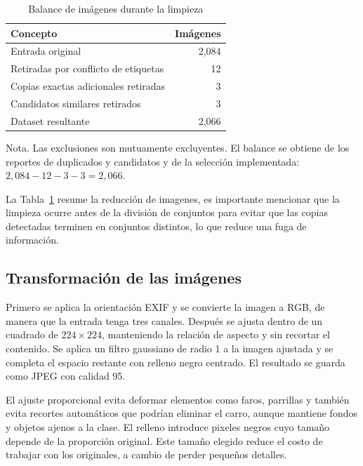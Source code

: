 \documentclass[conference]{IEEEtran}
\begin{document}
\begin{table}[!htbp]
\caption{Balance de imágenes durante la limpieza}
\label{tab:limpieza}
\centering
\small
\begin{tabular}{lr}
\toprule
Concepto & Imágenes \\
\midrule
Entrada original & 2,084 \\
Retiradas por conflicto de etiquetas & 12 \\
Copias exactas adicionales retiradas & 3 \\
Candidatos similares retirados & 3 \\
\midrule
Dataset resultante & 2,066 \\
\bottomrule
\end{tabular}
\par\smallskip
\begin{minipage}{\columnwidth}\scriptsize
Nota. Las exclusiones son mutuamente excluyentes. El balance se obtiene de los reportes de duplicados y candidatos y de la selección implementada: $2{,}084-12-3-3=2{,}066$.
\end{minipage}
\end{table}

La Tabla~\ref{tab:limpieza} resume la reducción de imagenes, es importante mencionar que la limpieza ocurre antes de la división de conjuntos para evitar que las copias detectadas terminen en conjuntos distintos, lo que reduce una fuga de información.

\vspace{2cm}

\subsection{Transformación de las imágenes}

Primero se aplica la orientación EXIF y se convierte la imagen a RGB, de manera que la entrada tenga tres canales. Después se ajusta dentro de un cuadrado de $224\times224$, manteniendo la relación de aspecto y sin recortar el contenido. Se aplica un filtro gaussiano de radio 1 a la imagen ajustada y se completa el espacio restante con relleno negro centrado. El resultado se guarda como JPEG con calidad 95.

El ajuste proporcional evita deformar elementos como faros, parrillas y también evita recortes automáticos que podrían eliminar el carro, aunque mantiene fondos y objetos ajenos a la clase. El relleno introduce pixeles negros cuyo tamaño depende de la proporción original. Este tamaño elegido reduce el costo de trabajar con los originales, a cambio de perder pequeños detalles.
\end{document}
